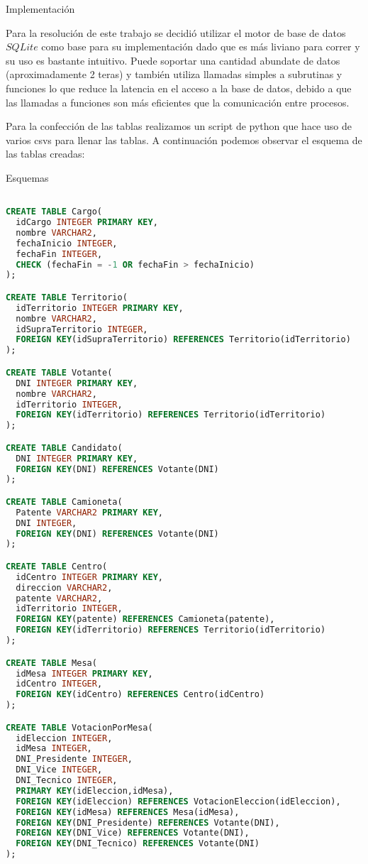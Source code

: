 \begin{section}{Implementaci\'on}

Para la resoluci\'on de este trabajo se decidi\'o utilizar el motor de base de datos $SQLite$ como base para su implementaci\'on dado que es m\'as liviano para correr y su uso es bastante intuitivo. Puede soportar una cantidad abundate de datos (aproximadamente 2 teras) y tambi\'en utiliza llamadas simples a subrutinas y funciones lo que reduce la latencia en el acceso a la base de datos, debido a que las llamadas a funciones son más eficientes que la comunicación entre procesos. 

Para la confecci\'on de las tablas realizamos un script de python que hace uso de varios csvs para llenar las tablas.
A continuaci\'on podemos observar el esquema de las tablas creadas:

\begin{subsection}{Esquemas}
\begin{lstlisting}[language=SQL, basicstyle=\footnotesize]

CREATE TABLE Cargo(
  idCargo INTEGER PRIMARY KEY, 
  nombre VARCHAR2, 
  fechaInicio INTEGER, 
  fechaFin INTEGER,
  CHECK (fechaFin = -1 OR fechaFin > fechaInicio)
);

CREATE TABLE Territorio(
  idTerritorio INTEGER PRIMARY KEY, 
  nombre VARCHAR2, 
  idSupraTerritorio INTEGER, 
  FOREIGN KEY(idSupraTerritorio) REFERENCES Territorio(idTerritorio)
);

CREATE TABLE Votante(
  DNI INTEGER PRIMARY KEY, 
  nombre VARCHAR2, 
  idTerritorio INTEGER, 
  FOREIGN KEY(idTerritorio) REFERENCES Territorio(idTerritorio)
);

CREATE TABLE Candidato(
  DNI INTEGER PRIMARY KEY,
  FOREIGN KEY(DNI) REFERENCES Votante(DNI)
);

CREATE TABLE Camioneta(
  Patente VARCHAR2 PRIMARY KEY, 
  DNI INTEGER, 
  FOREIGN KEY(DNI) REFERENCES Votante(DNI)
);

CREATE TABLE Centro(
  idCentro INTEGER PRIMARY KEY, 
  direccion VARCHAR2, 
  patente VARCHAR2, 
  idTerritorio INTEGER, 
  FOREIGN KEY(patente) REFERENCES Camioneta(patente), 
  FOREIGN KEY(idTerritorio) REFERENCES Territorio(idTerritorio)
);

CREATE TABLE Mesa(
  idMesa INTEGER PRIMARY KEY, 
  idCentro INTEGER, 
  FOREIGN KEY(idCentro) REFERENCES Centro(idCentro)
);

CREATE TABLE VotacionPorMesa(
  idEleccion INTEGER, 
  idMesa INTEGER, 
  DNI_Presidente INTEGER, 
  DNI_Vice INTEGER, 
  DNI_Tecnico INTEGER, 
  PRIMARY KEY(idEleccion,idMesa), 
  FOREIGN KEY(idEleccion) REFERENCES VotacionEleccion(idEleccion), 
  FOREIGN KEY(idMesa) REFERENCES Mesa(idMesa), 
  FOREIGN KEY(DNI_Presidente) REFERENCES Votante(DNI), 
  FOREIGN KEY(DNI_Vice) REFERENCES Votante(DNI), 
  FOREIGN KEY(DNI_Tecnico) REFERENCES Votante(DNI)
);


\end{lstlisting}
\end{subsection}
\end{section}
